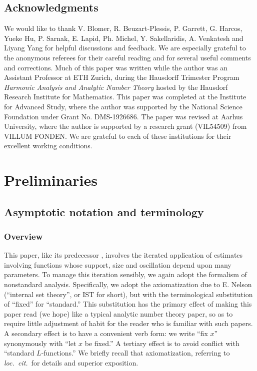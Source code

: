 \subsection*{Acknowledgments}
We would like to thank V. Blomer, R. Beuzart-Plessis, P. Garrett, G. Harcos, Yueke Hu, P. Sarnak, E. Lapid, Ph. Michel, Y. Sakellaridis, A. Venkatesh and Liyang Yang for helpful discussions and feedback.  We are especially grateful to the anonymous referees for their careful reading and for several useful comments and corrections.  Much of this paper was written while the author was an Assistant Professor at ETH Zurich, during the Hausdorff Trimester Program \emph{Harmonic Analysis and Analytic Number Theory} hosted by the Hausdorf Research Institute for Mathematics.  This paper was completed at the Institute for Advanced Study, where the author was supported by the National Science Foundation under Grant No. DMS-1926686.  The paper was revised at Aarhus University, where the author is supported by a research grant (VIL54509) from VILLUM FONDEN.  We are grateful to each of these institutions for their excellent working conditions.

\section{Preliminaries}\label{sec:preliminaries}

\subsection{Asymptotic notation and terminology}\label{sec:asympt-notat-term}
\subsubsection{Overview}\label{sec:asymptotic-notation-overview}
This paper, like its predecessor \cite{2020arXiv201202187N}, involves the iterated application of estimates involving functions whose support, size and oscillation depend upon many parameters.  To manage this iteration sensibly, we again adopt the formalism of nonstandard analysis.  Specifically, we adopt the axiomatization due to E. Nelson \cite{MR469763} (``internal set theory'', or IST for short), but with the terminological substitution of ``fixed'' for ``standard.''  This substitution has the primary effect of making this paper read (we hope) like a typical analytic number theory paper, so as to require little adjustment of habit for the reader who is familiar with such papers.  A secondary effect is to have a convenient verb form: we write ``fix $x$'' synonymously with ``let $x$ be fixed.''  A tertiary effect is to avoid conflict with ``standard $L$-functions.''  We briefly recall that axiomatization, referring to \emph{loc.\ cit.}\ for details and superior exposition.

